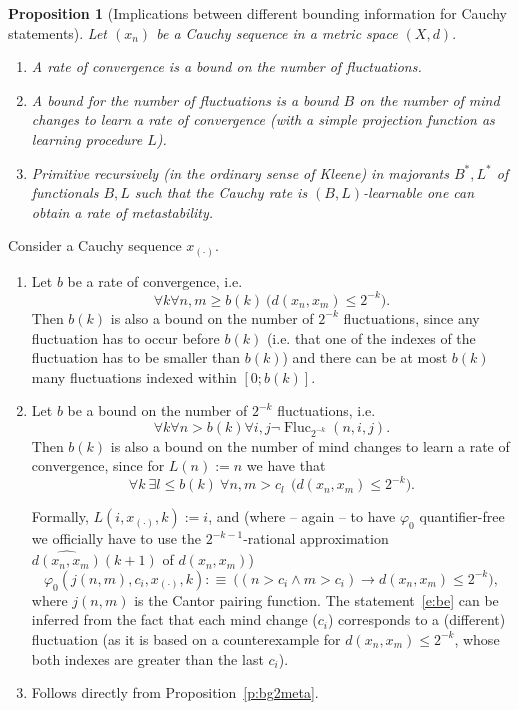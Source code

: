 \documentclass[1p]{elsarticle}
\DeclareMathOperator{\Fluc}{Fluc}
\theoremstyle{plain}
\newtheorem{prop}[thm]{Proposition}
\theoremstyle{definition}
\theoremstyle{remark}
\renewenvironment{proof}[1][]{\noindent{\bf Proof{#1}. }}{\nopagebreak[4]{\hspace*{\fill}
  $\Box$              %
 }{\vspace{2ex}}}
\renewcommand{\phi}{\varphi}
\theoremstyle{definition}
\begin{document}
{\begin{prop}[Implications between different bounding information 
for Cauchy statements] \label{prop.hierarchy}
Let $(x_n)$ be a Cauchy sequence in a metric space $(X,d).$ 
\begin{enumerate}
\item A rate of convergence is a bound on the number of fluctuations.
\item A bound for the number of fluctuations is a bound $B$ 
on the number of mind changes to learn a rate of convergence (with a  
simple projection function as learning procedure $L$).
\item 
Primitive recursively (in the ordinary sense of Kleene) in majorants 
$B^*,L^*$ of functionals $B,L$ such that the Cauchy rate is $(B,L)$-learnable 
one can obtain a rate of metastability. 
\end{enumerate}
\end{prop}
\begin{proof}
Consider a Cauchy sequence $x_{(\cdot)}$.
\begin{enumerate}
\item Let $b$ be a rate of convergence, i.e.
\[ \forall k \forall n,m\geq b(k)\ \big( d(x_n,x_m)\leq 2^{-k}\big). \]
Then $b(k)$ is also a bound on the number of $2^{-k}$ fluctuations, since any fluctuation has to occur before $b(k)$ (i.e. that one of the indexes of the 
fluctuation has to be smaller than $b(k)$) and there can be at most $b(k)$ many fluctuations indexed within $[0;b(k)]$.
\item Let $b$ be a bound on the number of $2^{-k}$ fluctuations, i.e.
\[ \forall k \forall n>b(k) \forall i,j \neg\Fluc_{2^{-k}}(n,i,j). \]
Then $b(k)$ is also a bound on the number of mind changes to learn a rate of convergence, since for 
$L(n):=n$ we have that
\[ \forall k\ \exists l\leq b(k)\ \forall n,m>c_l\ \ \big(  d(x_n,x_m)\leq 2^{-k}\big). \tag{BE}\label{e:be}\]
%

Formally, $L(i,x_{(\cdot)},k):=i$, and (where -- again -- to have 
$\varphi_0$ quantifier-free we officially have to use the $2^{-k-1}$-rational 
approximation $\widehat{d(x_n,x_m)}(k+1)$ of $d(x_n,x_m)$) 
\[
\phi_0(j(n,m),c_i,x_{(\cdot)},k):\equiv\ \big((n>c_i \wedge m>c_i) \rightarrow d(x_n,x_m)\leq 2^{-k}\big),
\]
where $j(n,m)$ is the Cantor pairing function.
%
The statement~\eqref{e:be} can be inferred from the fact that each mind change ($c_i$) corresponds to a (different) fluctuation (as it is based on a counterexample for $d(x_n,x_m)\leq 2^{-k}$, whose both indexes are greater than the last $c_i$).
\item Follows directly from Proposition~\ref{p:bg2meta}.
\end{enumerate}
\end{proof}



}
\end{document}
